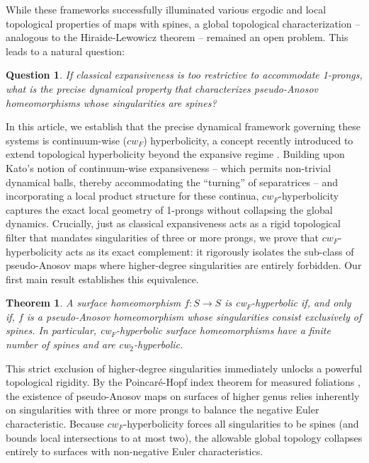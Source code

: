 \documentclass{amsart}
\theoremstyle{plain}
\newtheorem*{que}{Question}
\newtheorem{mainthm}{Theorem}
\theoremstyle{definition}
\begin{document}
While these frameworks successfully illuminated various ergodic and local topological properties of maps with spines, a global topological characterization -- analogous to the Hiraide-Lewowicz theorem -- remained an open problem. This leads to a natural question: 

\begin{que}
If classical expansiveness is too restrictive to accommodate 1-prongs, what is the precise dynamical property that characterizes pseudo-Anosov homeomorphisms whose singularities are spines?
\end{que}


In this article, we establish that the precise dynamical framework governing these systems is continuum-wise ($cw_F$) hyperbolicity, a concept recently introduced to extend topological hyperbolicity beyond the expansive regime \cite{ACS, ACCV3}.
Building upon Kato's notion of continuum-wise expansiveness \cite{K1, K2} -- which permits non-trivial dynamical balls, thereby accommodating the ``turning'' of separatrices -- and incorporating a local product structure for these continua, $cw_F$-hyperbolicity captures the exact local geometry of 1-prongs without collapsing the global dynamics. Crucially, just as classical expansiveness acts as a rigid topological filter that mandates singularities of three or more prongs, we prove that $cw_F$-hyperbolicity acts as its exact complement: it rigorously isolates the sub-class of pseudo-Anosov maps where higher-degree singularities are entirely forbidden. Our first main result establishes this equivalence.

\begin{mainthm}\label{Bcw}
A surface homeomorphism $f\colon S\to S$ is cw$_F$-hyperbolic if, and only if, $f$ is a pseudo-Anosov homeomorphism whose singularities  consist exclusively of spines. In particular, cw$_F$-hyperbolic surface homeomorphisms have a finite number of spines and are cw$_2$-hyperbolic.
\end{mainthm}

This strict exclusion of higher-degree singularities immediately unlocks a powerful topological rigidity. By the Poincaré-Hopf index theorem for measured foliations \cite{FLM, FLPKM}, the existence of pseudo-Anosov maps on surfaces of higher genus relies inherently on singularities with three or more prongs to balance the negative Euler characteristic. Because $cw_F$-hyperbolicity forces all singularities to be spines (and bounds local intersections to at most two), the allowable global topology collapses entirely to surfaces with non-negative Euler characteristics.
\end{document}
